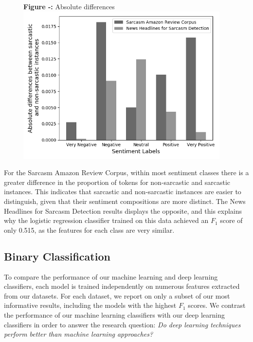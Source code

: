 \documentclass[12pt,a4paper]{article}
\begin{document}
\begin{minipage}{0.4\textwidth}
	\begin{figure}[H]
		\begin{center}
			\textbf{Figure -:} Absolute differences\\
			\includegraphics[width=0.95\textwidth]{Images/absolute_differences.png}
			\label{Sarcasm Amazon Review Corpus}
		\end{center}
	\end{figure}
\end{minipage} \hfill
\begin{minipage}{0.6\textwidth}
	For the Sarcasm Amazon Review Corpus, within most sentiment classes there is a greater difference in the proportion of tokens for non-sarcastic and sarcastic instances. This indicates that sarcastic and non-sarcastic instances are easier to distinguish, given that their sentiment compositions are more distinct. The News Headlines for Sarcasm Detection results displays the opposite, and this explains why the logistic regression classifier trained on this data achieved an $F_1$  score of only 0.515, as the features for each class are very similar.
\end{minipage}


\subsection{Binary Classification}\vspace{-5pt}
\noindent To compare the performance of our machine learning and deep learning classifiers, each model is trained independently on numerous features extracted from our datasets. For each dataset, we report on only a subset of our most informative results, including the models with the highest $F_1$ scores. We contrast the performance of our machine learning classifiers with our deep learning classifiers in order to answer the research question: \textit{Do deep learning techniques perform better than machine learning approaches?}\\\vspace{-5pt}
\end{document}
